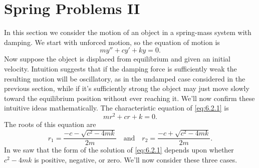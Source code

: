 \section{Spring Problems II}\label{sec:spring_ii}


In this section we consider the motion of an object in a spring-mass
system with damping. We start with unforced motion, so the equation of
motion is
\begin{equation}\label{eq:6.2.1}
my''+cy'+ky=0.
\end{equation}
Now suppose   the object is displaced from equilibrium and given an
initial velocity. Intuition suggests that if the damping force is
sufficiently weak the resulting motion will be oscillatory, as in the
undamped case considered in the previous section, while if it's
sufficiently strong the object may just move slowly toward the
equilibrium
position without ever reaching it. We'll now confirm these intuitive
ideas mathematically. The characteristic equation of \eqref{eq:6.2.1} is
\[
mr^2+cr+k=0.
\]
The roots of this equation are
\begin{equation}\label{eq:6.2.2}
r_1=\frac{-c-\sqrt{c^2-4mk}}{2m}\quad\text{and}\quad  r_2=
\frac{-c+\sqrt{c^2-4mk}}{2m}.
\end{equation}
In  we saw that the form of the
solution of  \eqref{eq:6.2.1} depends upon whether $c^2-4mk$ is positive,
negative, or zero. We'll now consider these three cases.



